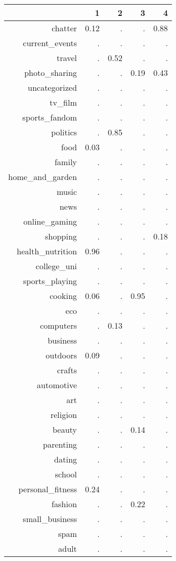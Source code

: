 \documentclass{article}
\begin{document}
\begin{center}
\begin{tabular}{rrrrr}
  \hline
 & 1 & 2 & 3 & 4 \\ 
  \hline
chatter & 0.12 & . & . & 0.88 \\ 
  current\_events & . & . & . & . \\ 
  travel & . & 0.52 & . & . \\ 
  photo\_sharing & . & . & 0.19 & 0.43 \\ 
  uncategorized & . & . & . & . \\ 
  tv\_film & . & . & . & . \\ 
  sports\_fandom & . & . & . & . \\ 
  politics & . & 0.85 & . & . \\ 
  food & 0.03 & . & . & . \\ 
  family & . & . & . & . \\ 
  home\_and\_garden & . & . & . & . \\ 
  music & . & . & . & . \\ 
  news & . & . & . & . \\ 
  online\_gaming & . & . & . & . \\ 
  shopping & . & . & . & 0.18 \\ 
  health\_nutrition & 0.96 & . & . & . \\ 
  college\_uni & . & . & . & . \\ 
  sports\_playing & . & . & . & . \\ 
  cooking & 0.06 & . & 0.95 & . \\ 
  eco & . & . & . & . \\ 
  computers & . & 0.13 & . & . \\ 
  business & . & . & . & . \\ 
  outdoors & 0.09 & . & . & . \\ 
  crafts & . & . & . & . \\ 
  automotive & . & . & . & . \\ 
  art & . & . & . & . \\ 
  religion & . & . & . & . \\ 
  beauty & . & . & 0.14 & . \\ 
  parenting & . & . & . & . \\ 
  dating & . & . & . & . \\ 
  school & . & . & . & . \\ 
  personal\_fitness & 0.24 & . & . & . \\ 
  fashion & . & . & 0.22 & . \\ 
  small\_business & . & . & . & . \\ 
  spam & . & . & . & . \\ 
  adult & . & . & . & . \\ 
   \hline
\end{tabular}
\end{center}
\end{document}
